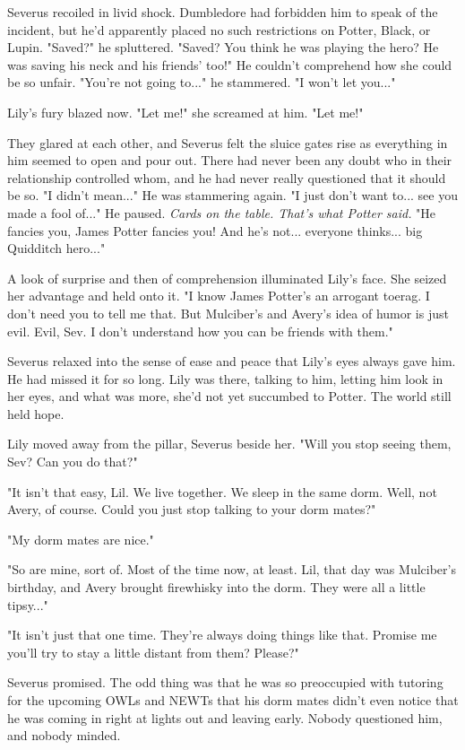 Severus recoiled in livid shock. Dumbledore had forbidden him to speak of the incident, but he'd apparently placed no such restrictions on Potter, Black, or Lupin. "Saved?" he spluttered. "Saved? You think he was playing the hero? He was saving his neck and his friends' too!" He couldn't comprehend how she could be so unfair. "You're not going to..." he stammered. "I won't let you..."

Lily's fury blazed now. "Let me!" she screamed at him. "Let me!"

They glared at each other, and Severus felt the sluice gates rise as everything in him seemed to open and pour out. There had never been any doubt who in their relationship controlled whom, and he had never really questioned that it should be so. "I didn't mean..." He was stammering again. "I just don't want to... see you made a fool of..." He paused. \emph{Cards on the table. That's what Potter said.} "He fancies you, James Potter fancies you! And he's not... everyone thinks... big Quidditch hero..."

A look of surprise and then of comprehension illuminated Lily's face. She seized her advantage and held onto it. "I know James Potter's an arrogant toerag. I don't need you to tell me that. But Mulciber's and Avery's idea of humor is just evil. Evil, Sev. I don't understand how you can be friends with them."

Severus relaxed into the sense of ease and peace that Lily's eyes always gave him. He had missed it for so long. Lily was there, talking to him, letting him look in her eyes, and what was more, she'd not yet succumbed to Potter. The world still held hope.

Lily moved away from the pillar, Severus beside her. "Will you stop seeing them, Sev? Can you do that?"

"It isn't that easy, Lil. We live together. We sleep in the same dorm. Well, not Avery, of course. Could you just stop talking to your dorm mates?"

"My dorm mates are nice."

"So are mine, sort of. Most of the time now, at least. Lil, that day was Mulciber's birthday, and Avery brought firewhisky into the dorm. They were all a little tipsy..."

"It isn't just that one time. They're always doing things like that. Promise me you'll try to stay a little distant from them? Please?"

Severus promised. The odd thing was that he was so preoccupied with tutoring for the upcoming OWLs and NEWTs that his dorm mates didn't even notice that he was coming in right at lights out and leaving early. Nobody questioned him, and nobody minded. 


